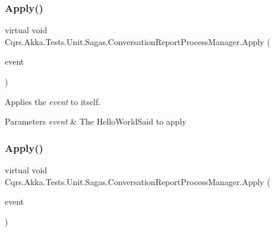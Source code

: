 \subsubsection{\texorpdfstring{Apply()}{Apply()}\hspace{0.1cm}{\footnotesize\ttfamily [1/3]}}
{\footnotesize\ttfamily virtual void Cqrs.\+Akka.\+Tests.\+Unit.\+Sagas.\+Conversation\+Report\+Process\+Manager.\+Apply (\begin{DoxyParamCaption}\item[{\hyperlink{classCqrs_1_1Akka_1_1Tests_1_1Unit_1_1Events_1_1HelloWorldSaid}{Hello\+World\+Said} @}]{event }\end{DoxyParamCaption})\hspace{0.3cm}{\ttfamily [virtual]}}



Applies the {\itshape event}  to itself. 


\begin{DoxyParams}{Parameters}
{\em event} & The Hello\+World\+Said to apply\\
\hline
\end{DoxyParams}
\mbox{\label{classCqrs_1_1Akka_1_1Tests_1_1Unit_1_1Sagas_1_1ConversationReportProcessManager_a938040ac51a3deb02ae36adb7f5999fb_a938040ac51a3deb02ae36adb7f5999fb}} 
\subsubsection{\texorpdfstring{Apply()}{Apply()}\hspace{0.1cm}{\footnotesize\ttfamily [2/3]}}
{\footnotesize\ttfamily virtual void Cqrs.\+Akka.\+Tests.\+Unit.\+Sagas.\+Conversation\+Report\+Process\+Manager.\+Apply (\begin{DoxyParamCaption}\item[{\hyperlink{classCqrs_1_1Akka_1_1Tests_1_1Unit_1_1Events_1_1HelloWorldRepliedTo}{Hello\+World\+Replied\+To} @}]{event }\end{DoxyParamCaption})\hspace{0.3cm}{\ttfamily [virtual]}}



